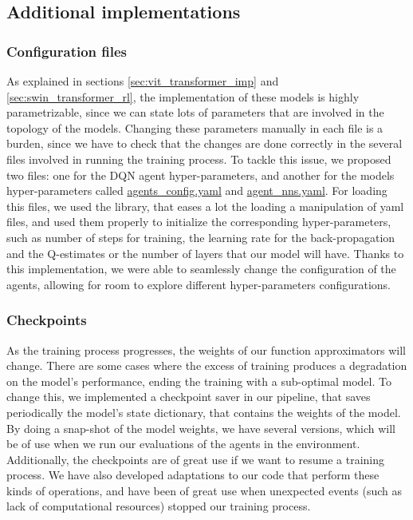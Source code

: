 \subsection{Additional implementations}

\subsubsection{Configuration files}
As explained in sections \ref{sec:vit_transformer_imp} and \ref{sec:swin_transformer_rl}, the implementation of these models is highly parametrizable, since we can state lots of parameters that are involved in the topology of the models. Changing these parameters manually in each file is a burden, since we have to check that the changes are done correctly in the several files involved in running the training process. To tackle this issue, we proposed two files: one for the DQN agent hyper-parameters, and another for the models hyper-parameters called \href{https://github.com/Javimh18/DL_TFM/blob/main/config/agents_config.yaml}{agents\_config.yaml} and \href{https://github.com/Javimh18/DL_TFM/blob/main/config/agent_nns.yaml}{agent\_nns.yaml}.
For loading this files, we used the  library, that eases a lot the loading a manipulation of yaml files, and used them properly to initialize the corresponding hyper-parameters, such as number of steps for training, the learning rate for the back-propagation and the Q-estimates or the number of layers that our model will have. Thanks to this implementation, we were able to seamlessly change the configuration of the agents, allowing for room to explore different hyper-parameters configurations.

\subsubsection{Checkpoints}
As the training process progresses, the weights of our function approximators will change. There are some cases where the excess of training produces a degradation on the model's performance, ending the training with a sub-optimal model. To change this, we implemented a checkpoint saver in our pipeline, that saves periodically the model's state dictionary, that contains the weights of the model. By doing a snap-shot of the model weights, we have several versions, which will be of use when we run our evaluations of the agents in the environment. Additionally, the checkpoints are of great use if we want to resume a training process. We have also developed adaptations to our code that perform these kinds of operations, and have been of great use when unexpected events (such as lack of computational resources) stopped our training process.


